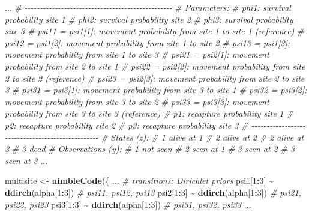 \documentclass[
  12pt,
]{krantz}
\newenvironment{Shaded}{\begin{snugshade}}{\end{snugshade}}
\newcommand{\CommentTok}[1]{\textcolor[rgb]{0.56,0.35,0.01}{\textit{#1}}}
\newcommand{\DecValTok}[1]{\textcolor[rgb]{0.00,0.00,0.81}{#1}}
\newcommand{\FunctionTok}[1]{\textcolor[rgb]{0.13,0.29,0.53}{\textbf{#1}}}
\newcommand{\NormalTok}[1]{#1}
\newcommand{\OtherTok}[1]{\textcolor[rgb]{0.56,0.35,0.01}{#1}}
\newcommand{\SpecialCharTok}[1]{\textcolor[rgb]{0.81,0.36,0.00}{\textbf{#1}}}
\begin{document}
\begin{Shaded}
\begin{Highlighting}[]
\NormalTok{...}
  \CommentTok{\# {-}{-}{-}{-}{-}{-}{-}{-}{-}{-}{-}{-}{-}{-}{-}{-}{-}{-}{-}{-}{-}{-}{-}{-}{-}{-}{-}{-}{-}{-}{-}{-}{-}{-}{-}{-}{-}{-}{-}{-}{-}{-}{-}{-}{-}{-}{-}{-}{-}}
  \CommentTok{\# Parameters:}
  \CommentTok{\# phi1: survival probability site 1}
  \CommentTok{\# phi2: survival probability site 2}
  \CommentTok{\# phi3: survival probability site 3}
  \CommentTok{\# psi11 = psi1[1]: movement probability from site 1 to site 1 (reference)}
  \CommentTok{\# psi12 = psi1[2]: movement probability from site 1 to site 2}
  \CommentTok{\# psi13 = psi1[3]: movement probability from site 1 to site 3 }
  \CommentTok{\# psi21 = psi2[1]: movement probability from site 2 to site 1}
  \CommentTok{\# psi22 = psi2[2]: movement probability from site 2 to site 2 (reference)}
  \CommentTok{\# psi23 = psi2[3]: movement probability from site 2 to site 3}
  \CommentTok{\# psi31 = psi3[1]: movement probability from site 3 to site 1}
  \CommentTok{\# psi32 = psi3[2]: movement probability from site 3 to site 2}
  \CommentTok{\# psi33 = psi3[3]: movement probability from site 3 to site 3 (reference)}
  \CommentTok{\# p1: recapture probability site 1}
  \CommentTok{\# p2: recapture probability site 2}
  \CommentTok{\# p3: recapture probability site 3}
  \CommentTok{\# {-}{-}{-}{-}{-}{-}{-}{-}{-}{-}{-}{-}{-}{-}{-}{-}{-}{-}{-}{-}{-}{-}{-}{-}{-}{-}{-}{-}{-}{-}{-}{-}{-}{-}{-}{-}{-}{-}{-}{-}{-}{-}{-}{-}{-}{-}{-}{-}{-}}
  \CommentTok{\# States (z):}
  \CommentTok{\# 1 alive at 1}
  \CommentTok{\# 2 alive at 2}
  \CommentTok{\# 2 alive at 3}
  \CommentTok{\# 3 dead}
  \CommentTok{\# Observations (y):  }
  \CommentTok{\# 1 not seen}
  \CommentTok{\# 2 seen at 1 }
  \CommentTok{\# 3 seen at 2}
  \CommentTok{\# 3 seen at 3}
\NormalTok{...}
\end{Highlighting}
\end{Shaded}

\begin{Shaded}
\begin{Highlighting}[]
\NormalTok{multisite }\OtherTok{\textless{}{-}} \FunctionTok{nimbleCode}\NormalTok{(\{}
\NormalTok{...}
  \CommentTok{\# transitions: Dirichlet priors}
\NormalTok{  psi1[}\DecValTok{1}\SpecialCharTok{:}\DecValTok{3}\NormalTok{] }\SpecialCharTok{\textasciitilde{}} \FunctionTok{ddirch}\NormalTok{(alpha[}\DecValTok{1}\SpecialCharTok{:}\DecValTok{3}\NormalTok{]) }\CommentTok{\# psi11, psi12, psi13}
\NormalTok{  psi2[}\DecValTok{1}\SpecialCharTok{:}\DecValTok{3}\NormalTok{] }\SpecialCharTok{\textasciitilde{}} \FunctionTok{ddirch}\NormalTok{(alpha[}\DecValTok{1}\SpecialCharTok{:}\DecValTok{3}\NormalTok{]) }\CommentTok{\# psi21, psi22, psi23}
\NormalTok{  psi3[}\DecValTok{1}\SpecialCharTok{:}\DecValTok{3}\NormalTok{] }\SpecialCharTok{\textasciitilde{}} \FunctionTok{ddirch}\NormalTok{(alpha[}\DecValTok{1}\SpecialCharTok{:}\DecValTok{3}\NormalTok{]) }\CommentTok{\# psi31, psi32, psi33}
\NormalTok{...}
\end{Highlighting}
\end{Shaded}
\end{document}
